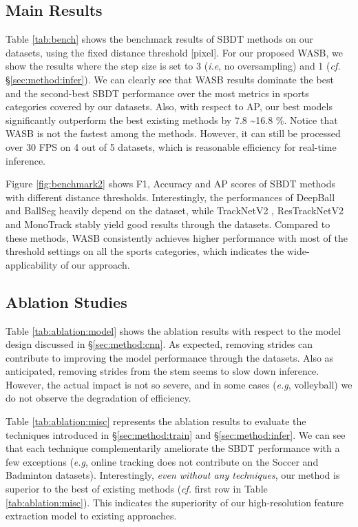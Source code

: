 \documentclass{bmvc2k}
\def\eg{\emph{e.g}\bmvaOneDot}
\def\ie{\emph{i.e}\bmvaOneDot}
\begin{document}
\subsection{Main Results}
\label{sec:eval:comp}
Table \ref{tab:bench} shows the benchmark results of SBDT methods on our datasets, using the fixed distance threshold  [pixel].
For our proposed WASB, we show the results where the step size is set to 3 (\ie, no oversampling) and 1 ({\it cf.} \S \ref{sec:method:infer}).
We can clearly see that WASB results dominate the best and the second-best SBDT performance over the most metrics in sports categories covered by our datasets.
Also, with respect to AP, our best models significantly outperform the best existing methods by 7.8 \textasciitilde 16.8 \%.
Notice that WASB is not the fastest among the methods.
However, it can still be processed over 30 FPS on 4 out of 5 datasets, which is reasonable efficiency for real-time inference.
\par
Figure \ref{fig:benchmark2} shows F1, Accuracy and AP scores of SBDT methods with different distance thresholds.
Interestingly, the performances of DeepBall \cite{komorowski+2019mva,komorowski+2020visapp} and BallSeg \cite{zandycke+2019mmsports} heavily depend on the dataset,
while TrackNetV2 \cite{sun+2020icpai}, ResTrackNetV2 and MonoTrack \cite{liu+2022cvprw} stably yield good results through the datasets.
Compared to these methods, WASB consistently achieves higher performance with most of the threshold settings on all the sports categories, which indicates the wide-applicability of our approach.
\subsection{Ablation Studies}
\label{sec:eval:ablation}
Table \ref{tab:ablation:model} shows the ablation results with respect to the model design discussed in \S \ref{sec:method:cnn}.
As expected, removing strides can contribute to improving the model performance through the datasets.
Also as anticipated, removing strides from the stem seems to slow down inference.
However, the actual impact is not so severe, and in some cases (\eg, volleyball) we do not observe the degradation of efficiency.
\par
Table \ref{tab:ablation:misc} represents the ablation results to evaluate the techniques introduced in \S \ref{sec:method:train} and \S \ref{sec:method:infer}.
We can see that each technique complementarily ameliorate the SBDT performance with a few exceptions (\eg, online tracking does not contribute on the Soccer and Badminton datasets).
Interestingly, {\it even without any techniques}, our method is superior to the best of existing methods ({\it cf.} first row in Table \ref{tab:ablation:misc}).
This indicates the superiority of our high-resolution feature extraction model to existing approaches.
\end{document}
